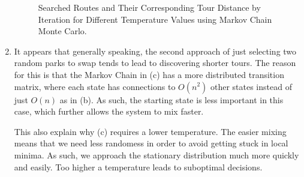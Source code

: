 \documentclass[12pt]{article}
\begin{document}
\begin{enumerate}[label=(\alph*)]
\begin{figure}[!ht]
      \caption{Searched Routes and Their Corresponding Tour Distance by Iteration for Different Temperature Values using Markov Chain Monte Carlo.}
      \label{fig:iteration_mcmc_2}
    \end{figure}

  \item It appears that generally speaking, the second approach of just selecting two random parks to swap tends to lead to discovering shorter tours. The reason for this is that the Markov Chain in (c) has a more distributed transition matrix, where each state has connections to $O(n^2)$ other states instead of just $O(n)$ as in (b). As such, the starting state is less important in this case, which further allows the system to mix faster. 

  This also explain why (c) requires a lower temperature. The easier mixing means that we need less randomess in order to avoid getting stuck in local minima. As such, we approach the stationary distribution much more quickly and easily. Too higher a temperature leads to suboptimal decisions.

\end{enumerate}
\end{document}
